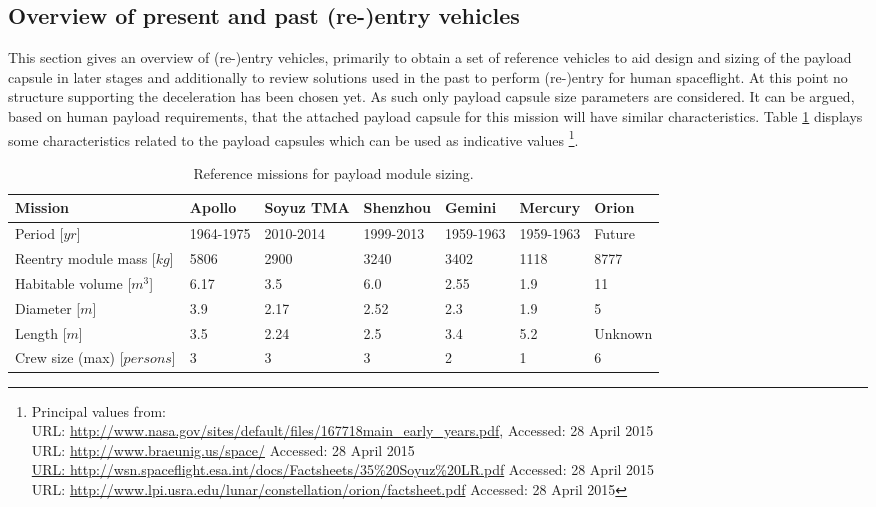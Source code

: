 \subsection{Overview of present and past (re-)entry vehicles}\label{cha:past missions}
This section gives an overview of (re-)entry vehicles, primarily to obtain a set of reference vehicles to aid design and sizing of the payload capsule in later stages and additionally to review solutions used in the past to perform (re-)entry for human spaceflight. At this point no structure supporting the deceleration has been chosen yet. As such only payload capsule size parameters are considered. It can be argued, based on human payload requirements, that the attached payload capsule for this mission will have similar characteristics. Table \ref{tab:refmis} displays some characteristics related to the payload capsules which can be used as indicative values \footnote{Principal values from: \\
URL: \url{http://www.nasa.gov/sites/default/files/167718main\_early\_years.pdf},  Accessed: 28 April 2015 \\ URL: \url{http://www.braeunig.us/space/} Accessed: 28 April 2015 \\ \url{URL: http://wsn.spaceflight.esa.int/docs/Factsheets/35\%20Soyuz\%20LR.pdf} Accessed: 28 April 2015 \\
URL: \url{http://www.lpi.usra.edu/lunar/constellation/orion/factsheet.pdf} Accessed: 28 April 2015}. 

\begin{table}[H]
	\caption[Reference missions for payload module sizing]{Reference missions for payload module sizing.}
		\begin{tabular}{|p{}|p{}|p{}|p{}|p{}|p{}|p{}|} %
			\hline
			Mission 						& Apollo & 	Soyuz TMA &	Shenzhou & Gemini & Mercury & Orion \\ \hline \hline
			Period [$yr$]					&	1964-1975	& 	2010-2014&	1999-2013 &   1959-1963  & 1959-1963 & Future \\ \hline
			Reentry module mass [$kg$]  	&	5806& 	2900 &	3240 & 3402 & 1118 & 8777 \\ \hline
			Habitable volume [$m^3$]		&	6.17& 	3.5  &	6.0  & 2.55 & 1.9 & 11   \\ \hline
			Diameter [$m$]			 		&	3.9 & 	2.17  &	2.52 & 2.3 & 1.9 & 5   \\ \hline
			Length  [$m$]			 		&	3.5 & 	2.24  &	2.5  & 3.4 &  5.2 & Unknown  \\ \hline
			Crew size (max) [$persons$]		&	3   & 	3     &	3    & 2   &  1   & 6   \\ \hline
		\end{tabular}
    \label{tab:refmis}
\end{table}

